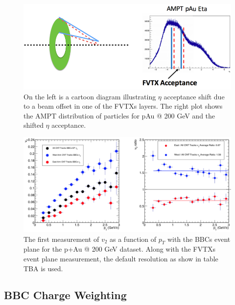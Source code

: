 \begin{figure}
\begin{center}
\includegraphics[width=0.95\linewidth]{figs/tilt_effect.png}
\caption{On the left is a cartoon diagram illustrating $\eta$ acceptance shift due to a beam offset in one of the FVTXs layers. The right plot shows the AMPT distribution of particles for pAu @ 200 GeV and the shifted $\eta$ acceptance. }
\end{center}
\end{figure}
\begin{figure}[!h]
\begin{center}
\includegraphics[width=0.95\linewidth]{figs/bbcs_default_ew.png}
\caption{The first measurement of $v_2$ as a function of $p_T$ with the BBCs event plane for the p+Au @ 200 GeV dataset. Along with the FVTXs event plane measurement, the default resolution as show in table TBA is used. }
\end{center}
\end{figure}
\subsection{BBC Charge Weighting}
